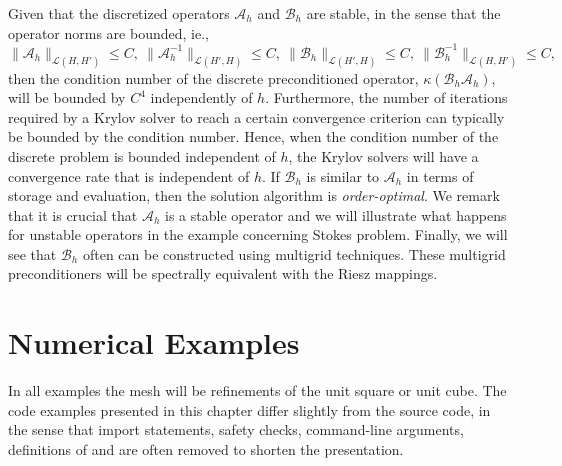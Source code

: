 Given that the discretized operators  $\mathcal{A}_h$ and $\mathcal{B}_h$ are stable, in the sense
that the operator norms are bounded, ie.,  
 \begin{equation}
\|\mathcal{A}_h\|_{\mathcal{L} (H, H')} \le C, \ \|\mathcal{A}_h^{-1}\|_{\mathcal{L} (H', H)} \le C, \ 
\|\mathcal{B}_h\|_{\mathcal{L}(H', H)} \le C,  \  \|\mathcal{B}_h^{-1}\|_{\mathcal{L}(H, H')} \le C, 
\end{equation}
then the condition number of the discrete preconditioned
operator, $\kappa(\mathcal{B}_h \mathcal{A}_h)$, will be bounded by $C^4$ independently of $h$. 
Furthermore, the number of iterations required 
by a Krylov solver to reach a certain convergence criterion can typically be bounded by
the condition number. Hence, when the condition number of the discrete problem is bounded independent
of $h$, the Krylov solvers will have a convergence rate that is independent of $h$. 
If $\mathcal{B}_h$ is similar to $\mathcal{A}_h$ in terms of storage and evaluation, 
then the solution algorithm is \emph{order-optimal}. 
We remark that it is crucial that $\mathcal{A}_h$
is a stable operator and we will illustrate what happens for unstable operators in the example concerning Stokes problem. 
Finally, we will see that $\mathcal{B}_h$ often can be constructed using multigrid techniques. These multigrid
preconditioners will be spectrally equivalent with the Riesz mappings. 

\section{Numerical Examples}
In all examples the mesh will be refinements of the unit square or unit cube. 
The code examples presented in this chapter differ slightly from the source
code, in the sense that import statements,  safety checks, command-line arguments, definitions of 
and \emp{Subdomains} are often removed to shorten the presentation. 


